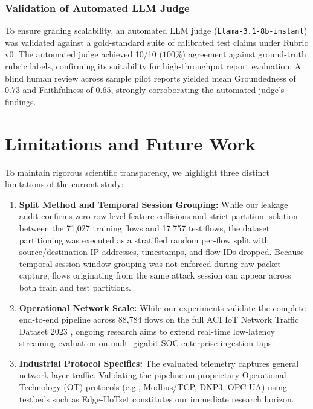 \documentclass[conference]{IEEEtran}
\begin{document}
\subsubsection{Validation of Automated LLM Judge}
To ensure grading scalability, an automated LLM judge (\texttt{Llama-3.1-8b-instant}) was validated against a gold-standard suite of calibrated test claims under Rubric v0. The automated judge achieved 10/10 ($100\%$) agreement against ground-truth rubric labels, confirming its suitability for high-throughput report evaluation. A blind human review across sample pilot reports yielded mean Groundedness of $0.73$ and Faithfulness of $0.65$, strongly corroborating the automated judge's findings.

\section{Limitations and Future Work}
To maintain rigorous scientific transparency, we highlight three distinct limitations of the current study:
\begin{enumerate}
    \item \textbf{Split Method and Temporal Session Grouping:} While our leakage audit confirms zero row-level feature collisions and strict partition isolation between the 71,027 training flows and 17,757 test flows, the dataset partitioning was executed as a stratified random per-flow split with source/destination IP addresses, timestamps, and flow IDs dropped. Because temporal session-window grouping was not enforced during raw packet capture, flows originating from the same attack session can appear across both train and test partitions.
    \item \textbf{Operational Network Scale:} While our experiments validate the complete end-to-end pipeline across 88,784 flows on the full ACI IoT Network Traffic Dataset 2023 \cite{ieeedataport2023aci, nack2024aci}, ongoing research aims to extend real-time low-latency streaming evaluation on multi-gigabit SOC enterprise ingestion taps.
    \item \textbf{Industrial Protocol Specifics:} The evaluated telemetry captures general network-layer traffic. Validating the pipeline on proprietary Operational Technology (OT) protocols (e.g., Modbus/TCP, DNP3, OPC UA) using testbeds such as Edge-IIoTset \cite{ferrag2022edge} constitutes our immediate research horizon.
\end{enumerate}
\end{document}

